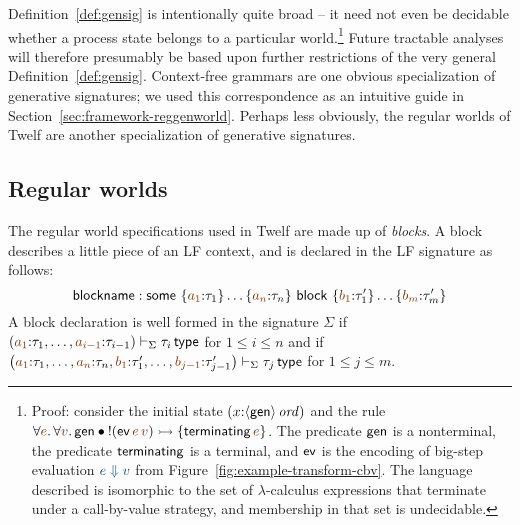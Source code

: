 Definition~\ref{def:gensig} is intentionally quite broad -- it need
not even be decidable whether a process state belongs to a particular
world.\footnote{Proof: consider the initial state
  $(x{:}{\langle {\sf gen} \rangle}\,{{\it ord}})$ and the rule $\forall
  \lf{e}.\,\forall\lf{v}.\,{\sf gen} \fuse {!}({\sf
    ev}\,\lf{e}\,\lf{v}) \lefti \{ {\sf terminating}\,\lf{e} \}$. The
  predicate ${\sf gen}$ is a nonterminal, the predicate ${\sf
    terminating}$ is a terminal, and ${\sf ev}$ is the encoding of
  big-step evaluation $\obj{e \Downarrow v}$ from
  Figure~\ref{fig:example-transform-cbv}.  The language described is
  isomorphic to the set of $\lambda$-calculus expressions that terminate
  under a call-by-value strategy,
  and membership in that set is undecidable.} Future tractable
analyses will therefore presumably be based upon further restrictions
of the very general Definition~\ref{def:gensig}.  Context-free
grammars are one obvious specialization of generative signatures; we
used this correspondence as an intuitive guide in
Section~\ref{sec:framework-reggenworld}.  Perhaps less obviously,
the regular worlds of Twelf \cite{schurmann00automating} are another
specialization of generative signatures.


\subsection{Regular worlds}
\label{sec:gen-regularworlds}

The
regular world specifications used in Twelf
\cite{schurmann00automating} are made up of {\it blocks}. A block
describes a little piece of an LF context, and is declared in the LF
signature as follows:
\[
 {\sf blockname} :
 {\sf some}~\{\lf{a_1}{:}\tau_1\}\ldots\{\lf{a_n}{:}\tau_n\}
~{\sf block}~\{\lf{b_1}{:}\tau'_1\}\ldots\{\lf{b_m}{:}\tau'_m\}
\]
A block declaration is well formed in the signature $\Sigma$ if 
$\left(\lf{a_1}{:}\tau_1,\ldots,\lf{a_{i-1}}{:} \tau_{i-1} \right)\vdash_\Sigma
\tau_i \,{\sf type}$ for $1 \leq i \leq n$ and if 
$\left(\lf{a_1}{:}\tau_1,\ldots,\lf{a_{n}}{:} \tau_{n},
 \lf{b_1}{:}\tau'_1,\ldots,\lf{b_{j-1}}{:}\tau'_{j-1}\right) \vdash_\Sigma
\tau_j \,{\sf type}$ for $1 \leq j \leq m$. 

